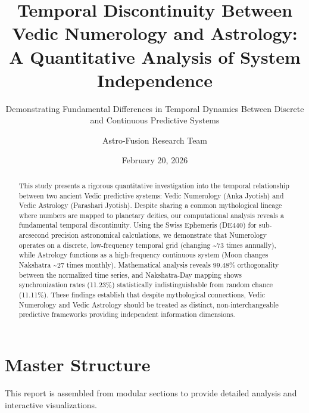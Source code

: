 \documentclass[
  11pt,
  a4paper,
  oneside,
  openany]{article}
\title{Temporal Discontinuity Between Vedic Numerology and Astrology: A
Quantitative Analysis of System Independence}
\subtitle{Demonstrating Fundamental Differences in Temporal Dynamics
Between Discrete and Continuous Predictive Systems}
\author{Astro-Fusion Research Team}
\date{February 20, 2026}
\renewcommand*\contentsname{Table of contents}
\newcommand\contentsname{Table of contents}
\begin{document}
\maketitle
\begin{abstract}
This study presents a rigorous quantitative investigation into the
temporal relationship between two ancient Vedic predictive systems:
Vedic Numerology (Anka Jyotish) and Vedic Astrology (Parashari Jyotish).
Despite sharing a common mythological lineage where numbers are mapped
to planetary deities, our computational analysis reveals a fundamental
temporal discontinuity. Using the Swiss Ephemeris (DE440) for
sub-arcsecond precision astronomical calculations, we demonstrate that
Numerology operates on a discrete, low-frequency temporal grid (changing
\textasciitilde73 times annually), while Astrology functions as a
high-frequency continuous system (Moon changes Nakshatra
\textasciitilde27 times monthly). Mathematical analysis reveals 99.48\%
orthogonality between the normalized time series, and Nakshatra-Day
mapping shows synchronization rates (11.23\%) statistically
indistinguishable from random chance (11.11\%). These findings establish
that despite mythological connections, Vedic Numerology and Vedic
Astrology should be treated as distinct, non-interchangeable predictive
frameworks providing independent information dimensions.
\end{abstract}

\renewcommand*\contentsname{Table of contents}
{
\hypersetup{linkcolor=}
\setcounter{tocdepth}{3}
\tableofcontents
}
\listoffigures
\listoftables
{}
\section{Master Structure}\label{master-structure}

\begin{tcolorbox}[enhanced jigsaw, left=2mm, bottomtitle=1mm, titlerule=0mm, title=\textcolor{quarto-callout-note-color}{\faInfo}\hspace{0.5em}{Note}, colbacktitle=quarto-callout-note-color!10!white, opacitybacktitle=0.6, opacityback=0, breakable, toprule=.15mm, leftrule=.75mm, bottomrule=.15mm, arc=.35mm, colframe=quarto-callout-note-color-frame, rightrule=.15mm, toptitle=1mm, colback=white, coltitle=black]

This report is assembled from modular sections to provide detailed
analysis and interactive visualizations.

\end{tcolorbox}
\end{document}
